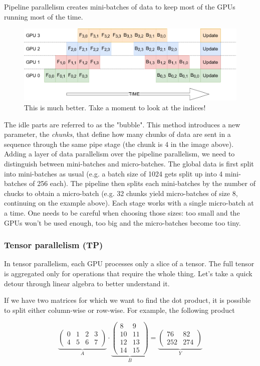 \documentclass{article}
\begin{document}
Pipeline parallelism creates mini-batches of data to keep most of the GPUs running most of the time.

\begin{figure}[h!]
  \center
  \includegraphics[width=0.7\linewidth]{images/2022-08-25-09-22-51.png}
  \caption{This is much better. Take a moment to look at the indices!}
\end{figure}
\FloatBarrier

The idle parts are referred to as the "bubble". This method introduces a new parameter, the \textit{chunks}, that define how many chunks of data are sent in a sequence through the same pipe stage (the chunk is 4 in the image above). Adding a layer of data parallelism over the pipeline parallelism, we need to distinguish between mini-batches and micro-batches. The global data is first split into mini-batches as usual (e.g. a batch size of 1024 gets split up into 4 mini-batches of 256 each). The pipeline then splits each mini-batches by the number of chucks to obtain a micro-batch (e.g. 32 chunks yield micro-batches of size 8, continuing on the example above). Each stage works with a single micro-batch at a time. One needs to be careful when choosing those sizes: too small and the GPUs won't be used enough, too big and the micro-batches become too tiny.

\subsubsection{Tensor parallelism (TP)}
In tensor parallelism, each GPU processes only a slice of a tensor. The full tensor is aggregated only for operations that require the whole thing. Let's take a quick detour through linear algebra to better understand it.

If we have two matrices for which we want to find the dot product, it is possible to split either column-wise or row-wise. For example, the following product

\[\underbrace{\begin{pmatrix}
0 & 1 & 2 & 3\\
4 & 5 & 6 & 7
\end{pmatrix}}_{A}\cdot \underbrace{\begin{pmatrix}
8 & 9\\
10 & 11\\
12 & 13\\
14 & 15
\end{pmatrix}}_{B}=\underbrace{\begin{pmatrix}
76 & 82\\
252 & 274
\end{pmatrix}}_{Y}\]
\end{document}
